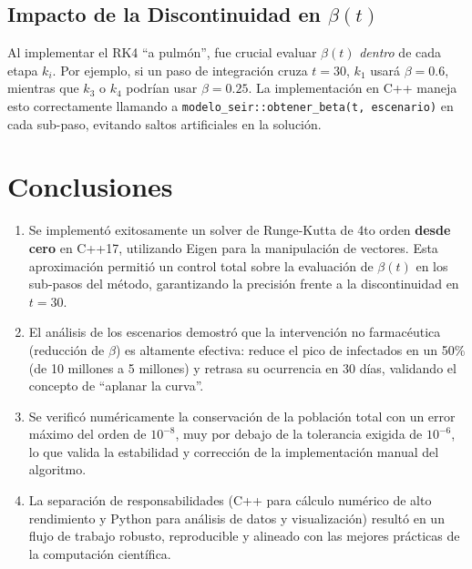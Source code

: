 \documentclass[12pt,a4paper]{article}
\theoremstyle{definition}
\begin{document}
\subsection{Impacto de la Discontinuidad en $\beta(t)$}

Al implementar el RK4 ``a pulm\'{o}n'', fue crucial evaluar $\beta(t)$ \textit{dentro} de cada etapa $k_i$. Por ejemplo, si un paso de integraci\'{o}n cruza $t=30$, $k_1$ usar\'{a} $\beta=0.6$, mientras que $k_3$ o $k_4$ podr\'{i}an usar $\beta=0.25$. La implementaci\'{o}n en C++ maneja esto correctamente llamando a \texttt{modelo\_seir::obtener\_beta(t, escenario)} en cada sub-paso, evitando saltos artificiales en la soluci\'{o}n.

\section{Conclusiones}\label{sec:conclusiones}

\begin{enumerate}
    \item Se implement\'{o} exitosamente un solver de Runge-Kutta de 4to orden \textbf{desde cero} en C++17, utilizando Eigen para la manipulaci\'{o}n de vectores. Esta aproximaci\'{o}n permiti\'{o} un control total sobre la evaluaci\'{o}n de $\beta(t)$ en los sub-pasos del m\'{e}todo, garantizando la precisi\'{o}n frente a la discontinuidad en $t=30$.
    
    \item El an\'{a}lisis de los escenarios demostr\'{o} que la intervenci\'{o}n no farmac\'{e}utica (reducci\'{o}n de $\beta$) es altamente efectiva: reduce el pico de infectados en un 50\% (de 10 millones a 5 millones) y retrasa su ocurrencia en 30 d\'{i}as, validando el concepto de ``aplanar la curva''.
    
    \item Se verific\'{o} num\'{e}ricamente la conservaci\'{o}n de la poblaci\'{o}n total con un error m\'{a}ximo del orden de $10^{-8}$, muy por debajo de la tolerancia exigida de $10^{-6}$, lo que valida la estabilidad y correcci\'{o}n de la implementaci\'{o}n manual del algoritmo.
    
    \item La separaci\'{o}n de responsabilidades (C++ para c\'{a}lculo num\'{e}rico de alto rendimiento y Python para an\'{a}lisis de datos y visualizaci\'{o}n) result\'{o} en un flujo de trabajo robusto, reproducible y alineado con las mejores pr\'{a}cticas de la computaci\'{o}n cient\'{i}fica.
\end{enumerate}
\end{document}
